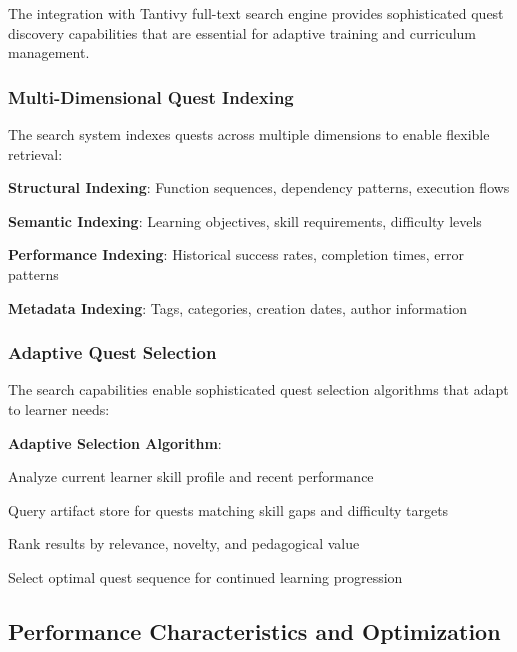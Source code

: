 The integration with Tantivy full-text search engine provides sophisticated quest discovery capabilities that are essential for adaptive training and curriculum management.

\subsubsection*{Multi-Dimensional Quest Indexing}

The search system indexes quests across multiple dimensions to enable flexible retrieval:

\begin{expandedlist}
    \item \textbf{Structural Indexing}: Function sequences, dependency patterns, execution flows
    \item \textbf{Semantic Indexing}: Learning objectives, skill requirements, difficulty levels
    \item \textbf{Performance Indexing}: Historical success rates, completion times, error patterns
    \item \textbf{Metadata Indexing}: Tags, categories, creation dates, author information
\end{expandedlist}

\subsubsection*{Adaptive Quest Selection}

The search capabilities enable sophisticated quest selection algorithms that adapt to learner needs:

\begin{alertbox}
\textbf{Adaptive Selection Algorithm}:
\begin{compactlist}
    \item Analyze current learner skill profile and recent performance
    \item Query artifact store for quests matching skill gaps and difficulty targets
    \item Rank results by relevance, novelty, and pedagogical value
    \item Select optimal quest sequence for continued learning progression
\end{compactlist}
\end{alertbox}

\subsection*{Performance Characteristics and Optimization}

